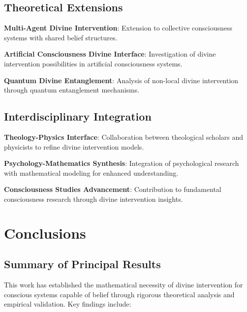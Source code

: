 \documentclass[12pt,a4paper]{article}
\begin{document}
\subsection{Theoretical Extensions}

\textbf{Multi-Agent Divine Intervention}:
Extension to collective consciousness systems with shared belief structures.

\textbf{Artificial Consciousness Divine Interface}:
Investigation of divine intervention possibilities in artificial consciousness systems.

\textbf{Quantum Divine Entanglement}:
Analysis of non-local divine intervention through quantum entanglement mechanisms.

\subsection{Interdisciplinary Integration}

\textbf{Theology-Physics Interface}:
Collaboration between theological scholars and physicists to refine divine intervention models.

\textbf{Psychology-Mathematics Synthesis}:
Integration of psychological research with mathematical modeling for enhanced understanding.

\textbf{Consciousness Studies Advancement}:
Contribution to fundamental consciousness research through divine intervention insights.

\section{Conclusions}

\subsection{Summary of Principal Results}

This work has established the mathematical necessity of divine intervention for conscious systems capable of belief through rigorous theoretical analysis and empirical validation. Key findings include:
\end{document}
